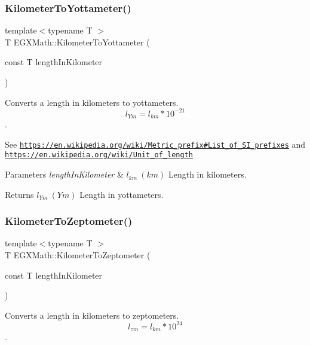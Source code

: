 \subsubsection{\texorpdfstring{Kilometer\+To\+Yottameter()}{KilometerToYottameter()}}
{\footnotesize\ttfamily template$<$typename T $>$ \\
T E\+G\+X\+Math\+::\+Kilometer\+To\+Yottameter (\begin{DoxyParamCaption}\item[{const T}]{length\+In\+Kilometer }\end{DoxyParamCaption})}



Converts a length in kilometers to yottameters. \[ l_{Ym}=l_{km} * 10^{-21} \]. 

See \href{https://en.wikipedia.org/wiki/Metric_prefix#List_of_SI_prefixes}{\tt https\+://en.\+wikipedia.\+org/wiki/\+Metric\+\_\+prefix\#\+List\+\_\+of\+\_\+\+S\+I\+\_\+prefixes} and \href{https://en.wikipedia.org/wiki/Unit_of_length}{\tt https\+://en.\+wikipedia.\+org/wiki/\+Unit\+\_\+of\+\_\+length} 
\begin{DoxyParams}{Parameters}
{\em length\+In\+Kilometer} & $ l_{km}\ (km)$ Length in kilometers. \\
\hline
\end{DoxyParams}
\begin{DoxyReturn}{Returns}
$ l_{Ym}\ (Ym)$ Length in yottameters. 
\end{DoxyReturn}
\mbox{\label{group___e_g_x_math-_conversions-_length_conversions-_s_i-_kilometer-_s_i_ga377d2c4ad2db833c5a7c16861600da49}} 
\subsubsection{\texorpdfstring{Kilometer\+To\+Zeptometer()}{KilometerToZeptometer()}}
{\footnotesize\ttfamily template$<$typename T $>$ \\
T E\+G\+X\+Math\+::\+Kilometer\+To\+Zeptometer (\begin{DoxyParamCaption}\item[{const T}]{length\+In\+Kilometer }\end{DoxyParamCaption})}



Converts a length in kilometers to zeptometers. \[ l_{zm}=l_{km} * 10^{24} \]. 

